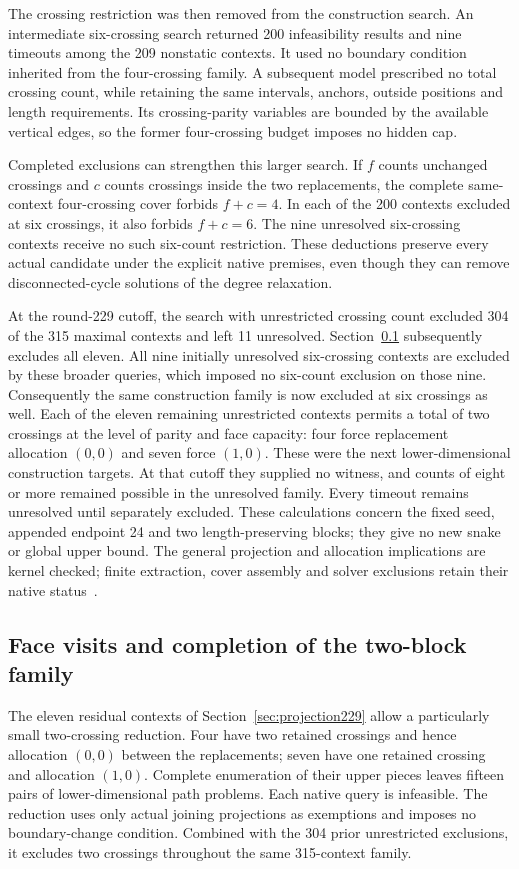 \documentclass[11pt,a4paper]{article}
\theoremstyle{definition}
\theoremstyle{remark}
\begin{document}
The crossing restriction was then removed from the construction search.
An intermediate six-crossing search returned 200 infeasibility results
and nine timeouts among the 209 nonstatic contexts. It used no boundary
condition inherited from the four-crossing family. A subsequent model
prescribed no total crossing count, while retaining the same intervals,
anchors, outside positions and length requirements. Its crossing-parity
variables are bounded by the available vertical edges, so the former
four-crossing budget imposes no hidden cap.

Completed exclusions can strengthen this larger search. If $f$ counts
unchanged crossings and $c$ counts crossings inside the two replacements,
the complete same-context four-crossing cover forbids $f+c=4$.
In each of the 200 contexts excluded at six crossings, it also forbids
$f+c=6$. The nine unresolved six-crossing contexts receive no such
six-count restriction. These deductions preserve every actual candidate
under the explicit native premises, even though they can remove
disconnected-cycle solutions of the degree relaxation.

At the round-229 cutoff, the search with unrestricted crossing count
excluded 304 of the 315 maximal contexts and left 11 unresolved.
Section~\ref{sec:facevisits230} subsequently excludes all eleven.
All nine initially unresolved six-crossing contexts are excluded by these
broader queries, which imposed no six-count exclusion on those nine.
Consequently the same construction family is now excluded at six
crossings as well. Each of the eleven remaining unrestricted contexts
permits a total of two crossings at the level of parity and face capacity:
four force replacement allocation $(0,0)$ and seven force $(1,0)$.
These were the next lower-dimensional construction targets. At that
cutoff they supplied no witness, and counts of eight or more remained
possible in the unresolved family.
Every timeout remains unresolved until separately excluded. These
calculations concern the fixed seed, appended endpoint 24 and two
length-preserving blocks; they give no new snake or global upper bound.
The general projection and allocation implications are kernel checked;
finite extraction, cover assembly and solver exclusions retain their
native status~\cite{research229}.

\subsection{Face visits and completion of the two-block family}
\label{sec:facevisits230}
The eleven residual contexts of Section~\ref{sec:projection229} allow a
particularly small two-crossing reduction. Four have two retained
crossings and hence allocation $(0,0)$ between the replacements; seven
have one retained crossing and allocation $(1,0)$. Complete enumeration
of their upper pieces leaves fifteen pairs of lower-dimensional path
problems. Each native query is infeasible. The reduction uses only actual
joining projections as exemptions and imposes no boundary-change
condition. Combined with the 304 prior unrestricted exclusions, it
excludes two crossings throughout the same 315-context family.
\end{document}
